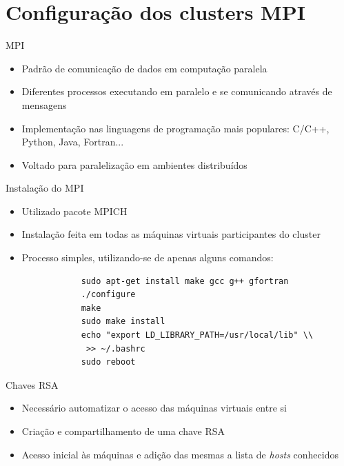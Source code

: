 \documentclass{beamer}
\begin{document}
\section{Configuração dos clusters MPI}

\begin{frame}{MPI}
	\begin{itemize}
		\item Padrão de comunicação de dados em computação paralela
		\item Diferentes processos executando em paralelo e se comunicando através de mensagens
		\item Implementação nas linguagens de programação mais populares: C/C++, Python, Java, Fortran...
		\item Voltado para paralelização em ambientes distribuídos 
	\end{itemize}
\end{frame}

\begin{frame}[fragile]{Instalação do MPI}
	\begin{itemize}
		\item Utilizado pacote MPICH
		\item Instalação feita em todas as máquinas virtuais participantes do cluster
		\item Processo simples, utilizando-se de apenas alguns comandos:
			\begin{verbatim}		
			sudo apt-get install make gcc g++ gfortran  
			./configure
			make
			sudo make install
			echo "export LD_LIBRARY_PATH=/usr/local/lib" \\
			 >> ~/.bashrc
			sudo reboot
		\end{verbatim}

	\end{itemize}
\end{frame}	
	
\begin{frame}{Chaves RSA}
	\begin{itemize}
		\item Necessário automatizar o acesso das máquinas virtuais entre si
		\item Criação e compartilhamento de uma chave RSA
		\item Acesso inicial às máquinas e adição das mesmas a lista de \textit{hosts} conhecidos
	\end{itemize}	
\end{frame}
\end{document}
